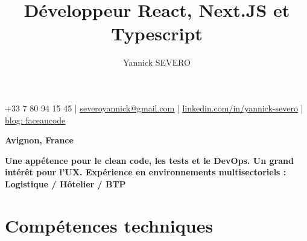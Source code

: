 \documentclass{article}
\title{Développeur React, Next.JS et Typescript}
\author{Yannick SEVERO}
\date{}
\begin{document}
\maketitle
\thispagestyle{empty} %
\vspace{-4em}

\begin{center}
+33 7 80 94 15 45 | \href{mailto:severoyannick@gmail.com}{\underline{severoyannick@gmail.com}} | \href{https://linkedin.com/in/yannick-severo}{\underline{linkedin.com/in/yannick-severo}} | \href{https://www.faceaucode.com/}{\underline{blog: faceaucode}}
\end{center}
\begin{center}
\textbf{Avignon, France}
\end{center}


\begin{center}
\textbf{Une appétence pour le clean code, les tests et le DevOps. Un grand intérêt pour l'UX. Expérience en environnements multisectoriels : Logistique / Hôtelier / BTP}
\end{center}

\section*{Compétences techniques}
\end{document}
